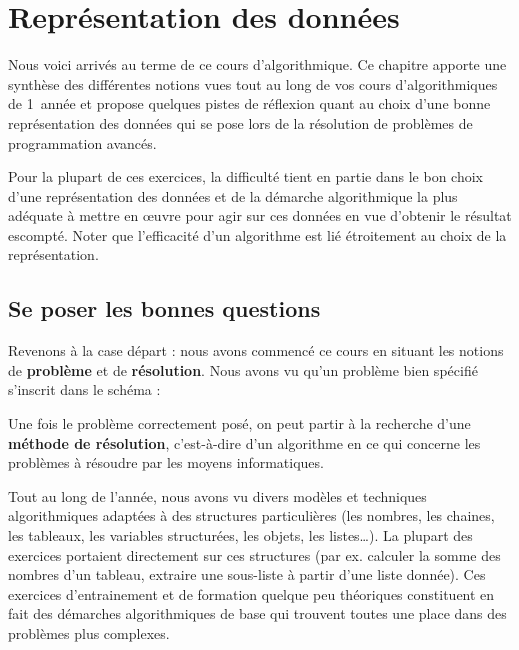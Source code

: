 \chapter{Représentation des données%
}

Nous voici arrivés au terme de ce cours d'algorithmique. 
Ce chapitre apporte une synthèse des différentes notions vues 
tout au long de vos cours d'algorithmiques de 1\iere\ année 
et propose quelques pistes de réflexion 
quant au choix d’une bonne représentation des données 
qui se pose lors de la résolution de problèmes de programmation avancés.

Pour la plupart de ces exercices,
la difficulté tient en partie dans le bon choix d’une représentation des données 
et de la démarche algorithmique la plus adéquate à mettre en œuvre pour agir sur ces
données en vue d’obtenir le résultat escompté. Noter que l’efficacité
d’un algorithme est lié étroitement au choix de la représentation.

\section{Se poser les bonnes questions}

Revenons à la case départ : nous avons commencé ce cours en situant les
notions de \textbf{problème} et de \textbf{résolution}. Nous avons vu
qu’un problème bien spécifié s’inscrit dans le schéma :


Une fois le problème correctement posé, on peut partir à la recherche
d’une \textbf{méthode de résolution}, c’est-à-dire d’un algorithme en
ce qui concerne les problèmes à résoudre par les moyens informatiques.

Tout au long de l’année, nous avons vu divers modèles et techniques
algorithmiques adaptées à des structures particulières (les nombres,
les chaines, les tableaux, les variables structurées, les objets, les
listes\dots). La plupart des exercices portaient directement
sur ces structures (par ex. calculer la somme des nombres d’un tableau,
extraire une sous-liste à partir
d’une liste donnée). Ces exercices d’entrainement et de formation
quelque peu théoriques constituent en fait des démarches algorithmiques
de base qui trouvent toutes une place dans des problèmes plus
complexes.

